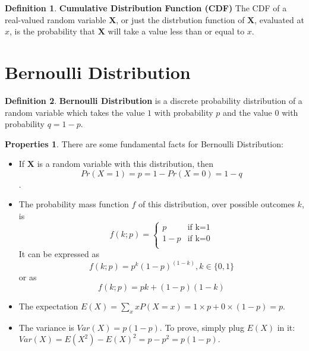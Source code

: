 \documentclass{article}
\theoremstyle{definition}
\newtheorem{defi}{Definition}[section]
\newtheorem{prop}{Properties}[section]
\begin{document}
\begin{defi}
\textbf{Cumulative Distribution Function (CDF)} The CDF of a real-valued random variable $\textbf{X}$, or just the distrbution function of $\textbf{X}$, evaluated at $x$, is the probability that $\textbf{X}$ will take a value less than or equal to $x$.
\end{defi}

\section{Bernoulli Distribution}
\begin{defi}
\textbf{Bernoulli Distribution} is a discrete probability distribution of a random variable which takes the value $1$ with probability $p$ and the value $0$ with probability $q=1-p$.
\end{defi}
\begin{prop} There are some fundamental facts for Bernoulli Distribution:
\begin{itemize}
    \item If $\textbf{X}$ is a random variable with this distribution, then $$Pr(X=1)=p=1-Pr(X=0)=1-q$$.
    \item The probability mass function $f$ of this distribution, over possible outcomes $k$, is $$f(k;p)=\begin{cases}
               p & \text{if k=1}\\
               1-p & \text{if k=0} \\
            \end{cases}$$ It can be expressed as $$f(k;p)=p^k(1-p)^{(1-k)}, k\in\{0,1\}$$ or as $$f(k;p)=pk+(1-p)(1-k)$$
    \item The expectation $E(X)=\sum_{x}xP(X=x)=1\times p + 0\times (1-p)=p$.
    \item The variance is $Var(X)=p(1-p)$. To prove, simply plug $E(X)$ in it: $Var(X)=E(X^2)-E(X)^2=p-p^2=p(1-p)$.
\end{itemize}
\end{prop}
\end{document}
